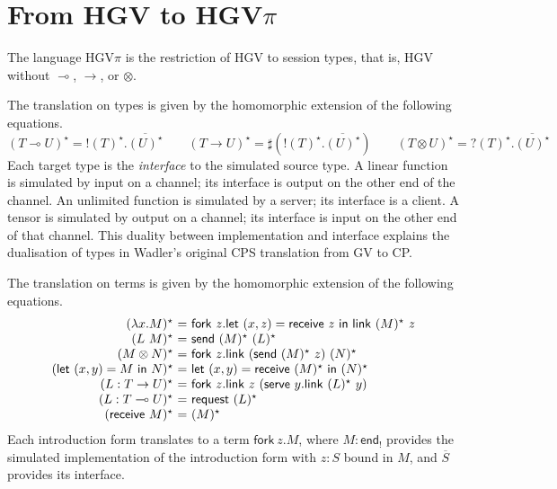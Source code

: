 \documentclass{easychair}
\makeatletter
\newcommand{\ba}{\begin{array}}
\newcommand{\ea}{\end{array}}
\newenvironment{equations}{\[\ba{@{}r@{~}c@{~}l@{}}}{\ea\]}
\newcommand{\key}{\mathsf}
\newcommand{\gvOutput}[2]{\mathord{!}{#1}.{#2}}
\newcommand{\gvInput}[2]{\mathord{?}{#1}.{#2}}
\newcommand{\gvEndOutput}{\key{end}_!}
\newcommand{\gvService}[1]{\sharp {#1}}
\newcommand{\gvDual}[1]{\overline{#1}}
\newcommand{\lolli}{\multimap}
\newcommand{\gvLinFun}[2]{{#1} \lolli {#2}}
\newcommand{\gvUnFun}[2]{{#1} \to {#2}}
\newcommand{\gvTimes}[2]{{#1} \otimes {#2}}
\newcommand{\gvLink}[2]{\key{link}~{#1}~{#2}}
\newcommand{\gvLam}[2]{\lambda {#1}.{#2}}
\newcommand{\gvApp}[2]{{#1}~{#2}}
\newcommand{\gvPair}[2]{({#1},{#2})}
\newcommand{\gvLet}[3]{\key{let}~{#1}={#2}~\key{in}~{#3}}
\newcommand{\gvSend}[2]{\key{send}~{#1}~{#2}}
\newcommand{\gvReceive}[1]{\key{receive}~{#1}}
\newcommand{\gvFork}[2]{\key{fork}~{#1}.{#2}}
\newcommand{\gvWith}[3]{\key{with}~{#1}~\key{connect}~{#2}~\key{to}~{#3}}
\newcommand{\gvServeOld}[3]{\key{serve}~{#1}({#2})={#3}}
\newcommand{\gvServe}[2]{\key{serve}~{#1}.{#2}}
\newcommand{\gvRequest}[1]{\key{request}~{#1}}
\newcommand{\hgv}{HGV\xspace}
\newcommand{\hgvpi}{HGV$\pi$\xspace}
\newcommand{\lampi}[1]{({#1})^\star}
\makeatother
\begin{document}


\section{From \hgv to \hgvpi}


The language \hgvpi is the restriction of \hgv to session types,
that is, \hgv without $\lolli$, $\to$, or $\otimes$.

The translation on types is given by the homomorphic extension of the
following equations.
\[
\lampi{\gvLinFun{T}{U}} = \gvOutput{\lampi{T}}{\gvDual{\lampi{U}}} \qquad
\lampi{\gvUnFun{T}{U}} = \gvService{(\gvOutput{\lampi{T}}{\gvDual{\lampi{U}}})} \qquad
\lampi{\gvTimes{T}{U}} = \gvInput{\lampi{T}}{\gvDual{\lampi{U}}}
\]%
Each target type is the \emph{interface} to the simulated source
type. A linear function is simulated by input on a channel; its
interface is output on the other end of the channel. An unlimited
function is simulated by a server; its interface is a client. A tensor
is simulated by output on a channel; its interface is input on the
other end of that channel.
%
This duality between implementation and interface explains the
dualisation of types in Wadler's original CPS translation from GV to
CP.

The translation on terms is given by the homomorphic extension of the
following equations.
\begin{equations}
\lampi{\gvLam{x}{M}} &=& \gvFork{z}{\gvLet{\gvPair{x}{z}}{\gvReceive{z}}{\gvLink{\lampi{M}}{z}}} \\
\lampi{\gvApp{L}{M}} &=& \gvSend{\lampi{M}}{\lampi{L}} \\
\lampi{\gvTimes{M}{N}} &=&
  \gvFork{z}
    {\gvLink{(\gvSend{\lampi{M}}{z})}{\lampi{N}}} \\
\lampi{\gvLet{\gvPair{x}{y}}{M}{N}} &=&
    \gvLet{\gvPair{x}{y}}{\gvReceive{\lampi{M}}}{\lampi{N}} \\
\lampi{L : \gvUnFun{T}{U}} &=&
  \gvFork{z}{\gvLink{z}{(\gvServe{y}{\gvLink{\lampi{L}}{y}})}} \\
\lampi{L : \gvLinFun{T}{U}} &=& \gvRequest{\lampi{L}} \\
\lampi{\gvReceive{M}} &=& \lampi{M} \\
\end{equations}%
Each introduction form translates to a term $\gvFork{z}{M}$, where $M
: \gvEndOutput$ provides the simulated implementation of the
introduction form with $z : S$ bound in $M$, and $\gvDual{S}$ provides
its interface.
\end{document}
